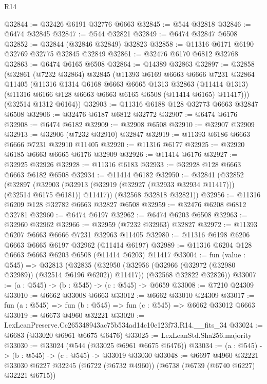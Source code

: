 \begin{lexlean}{R14}
\begin{coremodule}
@32844 := @32426 @6191 @32776 @6663
@32845 := @544 @32818
@32846 := @6474 @32845
@32847 := @544 @32821
@32849 := @6474 @32847 @6508
@32852 := @32844 (@32846 @32849) @32823
@32858 := @11316 @6171 @6190 @32769 @32775 @32845 @32849
@32861 := @32476 @6170 @6812 @32768
@32863 := @6474 @6165 @6508
@32864 := @14389 @32863
@32897 := @32858
    (@32861
      (@7232 @32864)
      @32845
      (@11393
        @6169
        @6663
        @6666
        @7231
        @32864
        @11405
        (@11316
          @1314
          @6168
          @6663
          @6665
          @1313
          @32863
          (@11414 @1313)
          (@11316 @6166 @128 @6663 @6663 @6165 @6508 (@11414 @6165) @11417)))
      (@32514 @1312 @6164))
@32903 := @11316 @6188 @128 @32773 @6663 @32847 @6508
@32906 := @32476 @6187 @6812 @32772
@32907 := @6474 @6176
@32908 := @6474 @6182
@32909 := @32908 @6508
@32910 := @32907 @32909
@32913 := @32906 (@7232 @32910) @32847
@32919 := @11393 @6186 @6663 @6666 @7231 @32910 @11405
@32920 := @11316 @6177
@32925 := @32920 @6185 @6663 @6665 @6176 @32909
@32926 := @11414 @6176
@32927 := @32925 @32926
@32928 := @11316 @6183
@32933 := @32928 @128 @6663 @6663 @6182 @6508
@32934 := @11414 @6182
@32950 := @32841
    (@32852
      (@32897
        (@32903 (@32913 (@32919 (@32927 (@32933 @32934 @11417))) (@32514 @6175 @6181)) @11417))
      (@32568 @32818 @32821))
@32956 := @11316 @6209 @128 @32782 @6663 @32827 @6508
@32959 := @32476 @6208 @6812 @32781
@32960 := @6474 @6197
@32962 := @6474 @6203 @6508
@32963 := @32960 @32962
@32966 := @32959 (@7232 @32963) @32827
@32972 := @11393 @6207 @6663 @6666 @7231 @32963 @11405
@32980 := @11316 @6198 @6206 @6663 @6665 @6197 @32962 (@11414 @6197)
@32989 := @11316 @6204 @128 @6663 @6663 @6203 @6508 (@11414 @6203) @11417
@33004 := fun (value : @545) =>
  @32813
    (@32835
      (@32950 (@32956 (@32966 (@32972 (@32980 @32989)) (@32514 @6196 @6202)) @11417))
      (@32568 @32822 @32826))
@33007 := (a : @545) -> (b : @545) -> (c : @545) -> @6659
@33008 := @7210 @24309
@33010 := @6662 @33008 @6663
@33012 := @6662 @33010 @24309
@33017 := fun (a : @545) => fun (b : @545) => fun (c : @545) => @6662 @33012 @6663
@33019 := @6673 @4960 @32221
@33020 := LexLeanPreserve.Cc265348943ac75b534ad14c10e123f73.R14.__fits_34
@33024 := @6683 (@33020 @6961 @6675 @6476)
@33025 := LexLeanStd.Sha256.majority
@33030 := @33024 (@544 (@33025 @6961 @6675 @6476))
@33034 := (a : @545) -> (b : @545) -> (c : @545) -> @33019 @33030
@33048 := @6697
    @4960
    @32221
    @33030
    @6227
    @32245
    (@6722 (@6732 @4960))
    (@6738 (@6739 (@6740 @6227) @32221 @6715))

\end{coremodule}
\end{lexlean}
